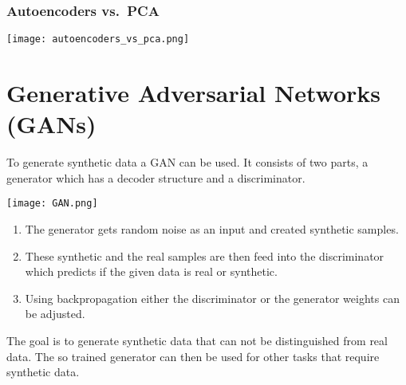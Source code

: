\subsubsection{Autoencoders vs.\ PCA}
\begin{center}
    \texttt{[image: autoencoders\_vs\_pca.png]}
\end{center}

\section{Generative Adversarial Networks (GANs)}

To generate synthetic data a GAN can be used. It consists of two parts, a generator which has a decoder structure and a discriminator. 
\begin{center}
    \texttt{[image: GAN.png]}
\end{center}
\begin{enumerate}
    \item The generator gets random noise as an input and created synthetic samples.
    \item These synthetic and the real samples are then feed into the discriminator which predicts if the given data is real or synthetic.
    \item Using backpropagation either the discriminator or the generator weights can be adjusted.
\end{enumerate}
The goal is to generate synthetic data that can not be distinguished from real data. The so trained generator can then be used for other tasks that require synthetic data.